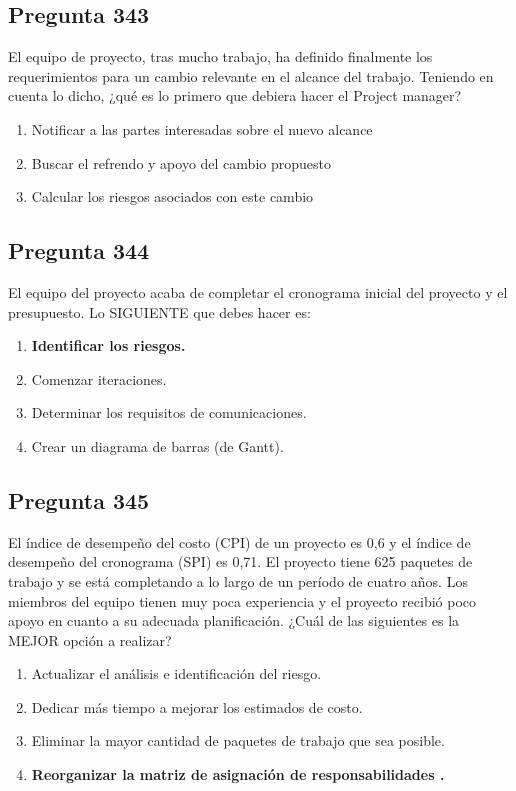 \documentclass[11pt,a4paper]{article}
\begin{document}
\subsection*{Pregunta 343}
El equipo de proyecto, tras mucho trabajo, ha definido finalmente los requerimientos para un cambio relevante en el alcance del trabajo. Teniendo en cuenta lo dicho, ¿qué es lo primero que debiera hacer el Project manager?

\begin{enumerate}[label=\alph*)]
  \item Notificar a las partes interesadas sobre el nuevo alcance
  \item Buscar el refrendo y apoyo del cambio propuesto
  \item Calcular los riesgos asociados con este cambio
\end{enumerate}

\subsection*{Pregunta 344}
El equipo del proyecto acaba de completar el cronograma inicial del proyecto y el presupuesto. Lo SIGUIENTE que debes hacer es:

\begin{enumerate}[label=\alph*)]
  \item \textbf{Identificar los riesgos.}
  \item Comenzar iteraciones.
  \item Determinar los requisitos de comunicaciones.
  \item Crear un diagrama de barras (de Gantt).
\end{enumerate}

\subsection*{Pregunta 345}
El índice de desempeño del costo (CPI) de un proyecto es 0,6 y el índice de desempeño del cronograma (SPI) es 0,71. El proyecto tiene 625 paquetes de trabajo y se está completando a lo largo de un período de cuatro años. Los miembros del equipo tienen muy poca experiencia y el proyecto recibió poco apoyo en cuanto a su adecuada planificación. ¿Cuál de las siguientes es la MEJOR opción a realizar?

\begin{enumerate}[label=\alph*)]
  \item Actualizar el análisis e identificación del riesgo.
  \item Dedicar más tiempo a mejorar los estimados de costo.
  \item Eliminar la mayor cantidad de paquetes de trabajo que sea posible.
  \item \textbf{Reorganizar la matriz de asignación de responsabilidades .}
\end{enumerate}
\end{document}
